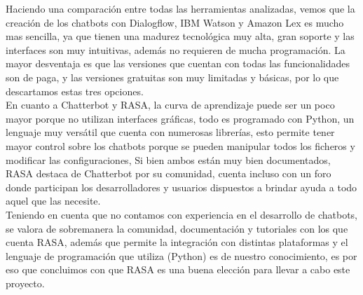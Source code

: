 \indent Haciendo una comparación entre todas las herramientas analizadas, vemos que la creación de los chatbots con Dialogflow, IBM Watson y Amazon Lex es mucho mas sencilla, ya que tienen una madurez tecnológica muy alta, gran soporte y las interfaces son muy intuitivas, además no requieren de mucha programación. La mayor desventaja es que las versiones que cuentan con todas las funcionalidades son de paga, y las versiones gratuitas son muy limitadas y básicas, por lo que descartamos estas tres opciones.\\
\indent En cuanto a Chatterbot y RASA, la curva de aprendizaje puede ser un poco mayor porque no utilizan interfaces gráficas, todo es programado con Python, un lenguaje muy versátil que cuenta con numerosas librerías, esto permite tener mayor control sobre los chatbots porque se pueden manipular todos los ficheros y modificar las configuraciones, Si bien ambos están muy bien documentados, RASA destaca de Chatterbot por su comunidad, cuenta incluso con un foro donde participan los desarrolladores y usuarios dispuestos a brindar ayuda a todo aquel que las necesite.\\
\indent Teniendo en cuenta que no contamos con experiencia en el desarrollo de chatbots, se valora de sobremanera la comunidad, documentación y tutoriales con los que cuenta RASA, además que permite la integración con distintas plataformas y el lenguaje de programación que utiliza (Python) es de nuestro conocimiento, es por eso que concluimos con que RASA es una buena elección para llevar a cabo este proyecto.
